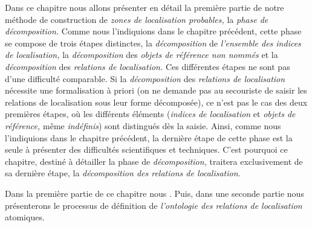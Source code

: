 Dans ce chapitre nous allons présenter en détail la première partie de
notre méthode de construction de \emph{zones de localisation
  probables,} la \emph{phase de décomposition.} Comme nous
l'indiquions dans le chapitre précédent, cette phase se compose de
trois étapes distinctes, la \emph{décomposition} de \emph{l'ensemble
  des indices de localisation,} la \emph{décomposition} des
\emph{objets de référence non nommés} et la \emph{décomposition} des
\emph{relations de localisation.} Ces différentes étapes ne sont pas
d'une difficulté comparable. Si la \emph{décomposition} des
\emph{relations de localisation} nécessite une formalisation à priori
(on ne demande pas au secouriste de saisir les relations de
localisation sous leur forme décomposée), ce n'est pas le cas des deux
premières étapes, où les différents éléments (\emph{indices de
  localisation} et \emph{objets de référence,} même \emph{indéfinis})
sont distingués dès la saisie. Ainsi, comme nous l'indiquions dans le
chapitre précédent, la dernière étape de cette phase est la seule à
présenter des difficultés scientifiques et techniques. C'est pourquoi
ce chapitre, destiné à détailler la phase de \emph{décomposition,}
traitera exclusivement de sa dernière étape, la \emph{décomposition
  des relations de localisation.}

Dans la première partie de ce chapitre nous . Puis, dans une seconde
partie nous présenterons le processus de définition de
\emph{l'ontologie des relations de localisation} atomiques.

